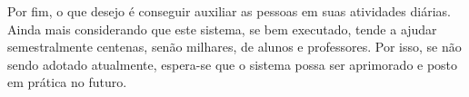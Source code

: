 

Por fim, o que desejo é conseguir auxiliar as pessoas em suas atividades diárias. Ainda mais considerando que este sistema, se bem executado, tende a ajudar semestralmente centenas, senão milhares, de alunos e professores. Por isso, se não sendo adotado atualmente, espera-se que o sistema possa ser aprimorado e posto em prática no futuro.
